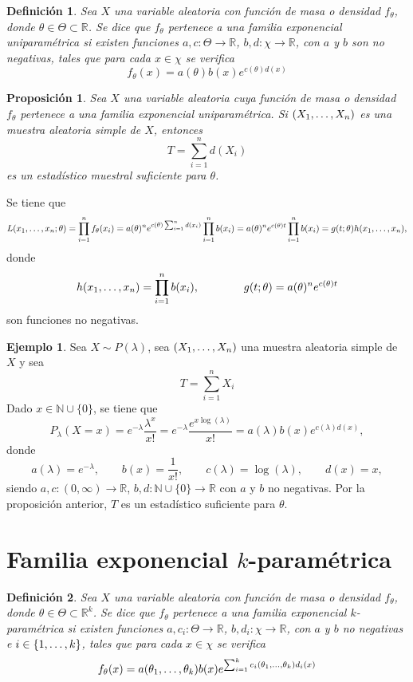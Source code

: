 \documentclass[11pt]{report}
\makeatletter
\renewenvironment{proof}[1][\proofname]{\par
  \pushQED{\qed}%
  \normalfont \topsep\z@skip %
  \trivlist
  \item[\hskip\labelsep
        \itshape
    #1\@addpunct{.}]\ignorespaces
}{%
  \popQED\endtrivlist\@endpefalse
}
\newtheorem{proposition}{Proposición}
\newtheorem{definition}{Definición}
\theoremstyle{definition}
\newtheorem{example}{Ejemplo}
\newcommand{\R}{\mathbb R}
\newcommand{\N}{\mathbb N}
\makeatother
\begin{document}
\begin{definition}
Sea $X$ una variable aleatoria con función de masa o densidad $f_\theta$, donde $\theta \in \Theta \subset \R$. Se dice que \emph{$f_\theta$ pertenece a una familia exponencial uniparamétrica} si existen funciones $a, c \colon \Theta \to \R$, $b,d \colon \chi \to \R$, con $a$ y $b$ son no negativas, tales que para cada $x \in \chi$ se verifica
\[f_\theta(x) = a(\theta) b(x)e^{c(\theta)d(x)}\]
\end{definition}

\begin{proposition}
Sea $X$ una variable aleatoria cuya función de masa o densidad $f_\theta$ pertenece a una familia exponencial uniparamétrica. Si $(X_1,\mathellipsis,X_n)$ es una muestra aleatoria simple de $X$, entonces
\[T=\sum_{i=1}^n d(X_i)\]
es un estadístico muestral suficiente para $\theta$.
\end{proposition}

\begin{proof}
Se tiene que
\[L(x_1,\mathellipsis,x_n;\theta) = \prod_{i=1}^n f_\theta(x_i) = a(\theta)^ne^{c(\theta)\sum_{i=1}^n d(x_i)}\prod_{i=1}^nb(x_i) = a(\theta)^ne^{c(\theta)t}\prod_{i=1}^nb(x_i) = g(t;\theta)h(x_1,\mathellipsis,x_n), \]
donde \[h(x_1,\mathellipsis,x_n) = \prod_{i=1}^n b(x_i),\qquad\qquad g(t;\theta)= a(\theta)^n e^{c(\theta)t}\]
son funciones no negativas.
\end{proof}

\begin{example}
Sea $X \sim P(\lambda)$, sea $(X_1,\mathellipsis,X_n)$ una muestra aleatoria simple de $X$ y sea
\[T=\sum_{i=1}^nX_i\]
Dado $x \in \N \cup \{0\}$, se tiene que
\[P_\lambda(X=x) = e^{-\lambda} \frac{\lambda^x}{x!} =e^{-\lambda}\frac{e^{x\log(\lambda)}}{x!} =a(\lambda)b(x)e^{c(\lambda)d(x)},\]
donde
\[a(\lambda) =e^{-\lambda}, \qquad b(x)=\frac{1}{x!}, \qquad c(\lambda) =\log(\lambda), \qquad d(x)= x,\]
siendo $a, c \colon (0,\infty) \to \R$, $b,d\colon \N \cup \{0\} \to \R$ con $a$ y $b$ no negativas. Por la proposición anterior, $T$ es un estadístico suficiente para $\theta$.
\end{example}

\section{Familia exponencial \texorpdfstring{$k$}{TEXT}-paramétrica}

\begin{definition}
Sea $X$ una variable aleatoria con función de masa o densidad $f_\theta$, donde $\theta \in \Theta \subset \R^k$. Se dice que \emph{$f_\theta$ pertenece a una familia exponencial $k$-paramétrica} si existen funciones $a, c_i \colon \Theta \to \R$, $b,d_i \colon \chi \to \R$, con $a$ y $b$ no negativas e $i \in \{1,\mathellipsis,k\}$, tales que para cada $x \in \chi$ se verifica
\[f_\theta(x) = a(\theta_1,\mathellipsis,\theta_k) b(x)e^{\sum_{i=1}^kc_i(\theta_1,\mathellipsis,\theta_k)d_i(x)}\]

\end{definition}
\end{document}
